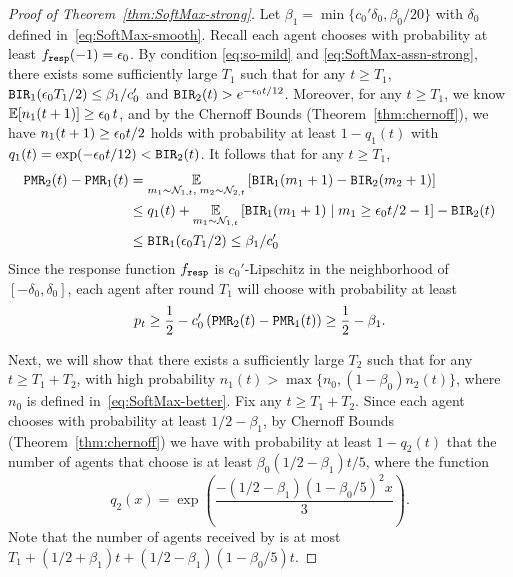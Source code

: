\begin{proof}[Proof of Theorem~\ref{thm:SoftMax-strong}]
  Let $\beta_1 = \min\{c_0'\delta_0, \beta_0/20\}$ with $\delta_0$
  defined in~\eqref{eq:SoftMax-smooth}.  Recall each agent chooses
  \alg[1] with probability at least $f_{\mathtt{resp}}(-1)= \epsilon_0$.  By
  condition \eqref{eq:so-mild} and \eqref{eq:SoftMax-assn-strong},
  there exists some sufficiently large $T_1$ such that for any
  $t\geq T_1$, $\mathtt{BIR}_1(\epsilon_0 T_1/2) \leq \beta_1/c_0'$ and
  $\mathtt{BIR}_2(t) > e^{-\epsilon_0 t/12}$. Moreover, for any $t\geq T_1$, we
  know $\E[n_1(t+1)] \geq \eps_0\,t $, and by the Chernoff Bounds
  (Theorem~\ref{thm:chernoff}), we have $n_1(t+1) \geq \epsilon_0 t/2$
  holds with probability at least $1 - q_1(t)$ with
  $q_1(t) = \exp(-\epsilon_0 t/12) < \mathtt{BIR}_2(t)$. It follows that for any $t\geq T_1$,
\begin{align*}
  \mathtt{PMR}_2(t) - \mathtt{PMR}_1(t) &= \operatorname*{\mathbb{E}}_{m_1\sim \mathcal{N}_{1,t},\;m_2\sim \mathcal{N}_{2,t}}\left[\mathtt{BIR}_1(m_1+ 1) - \mathtt{BIR}_2(m_2+1)\right] \\
                        &\leq q_1(t)  + \operatorname*{\mathbb{E}}_{m_1\sim \mathcal{N}_{1,t}}\left[\mathtt{BIR}_1(m_1+ 1)\mid m_1 \geq \epsilon_0 t/2 - 1 \right] - \mathtt{BIR}_2(t)\\
                        &\leq \mathtt{BIR}_1(\epsilon_0 T_1/2) \leq \beta_1/c_0'
\end{align*}
Since the response function $f_{\mathtt{resp}}$ is $c_0'$-Lipschitz in the
neighborhood of $[-\delta_0, \delta_0]$, each agent after round $T_1$
will choose \alg[1] with probability at least
\[
  p_t \geq \frac{1}{2} - c_0'\left(\mathtt{PMR}_2(t) - \mathtt{PMR}_1(t)\right) \geq
  \frac{1}{2} - \beta_1.
\]

Next, we will show that there exists a sufficiently large $T_2$ such
that for any $t\geq T_1 + T_2$, with high probability
$n_1(t) > \max\{n_0, (1 - \beta_0)n_2(t)\}$, where $n_0$ is defined
in~\eqref{eq:SoftMax-better}. %
Fix any $t \geq T_1 + T_2$. 
Since each agent chooses \alg[1] with probability at least
$1/2 - \beta_1$, by Chernoff Bounds (Theorem~\ref{thm:chernoff}) we
have with probability at least $1 - q_2(t)$ that the number of agents
that choose \alg[1] is at least $\beta_0(1/2 - \beta_1)t/5$, where the
function
$$
q_2(x) = \exp\left( \frac{-(1/2 - \beta_1)(1 - \beta_0/5)^2x}{3} \right).
$$
Note that the number of agents received by \alg[2] is at most
$T_1 + (1/2 + \beta_1)t + (1/2 - \beta_1)(1 - \beta_0/5)t$.


\end{proof}
